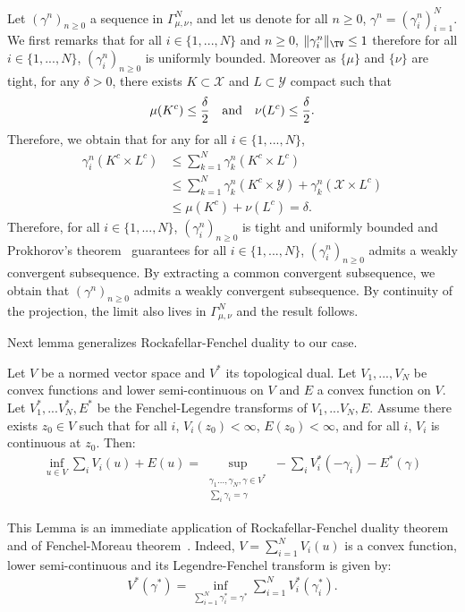 \begin{prv*}
Let $(\gamma^n)_{n\geq 0}$ a sequence in $\Gamma^N_{\mu,\nu}$, and let us denote for all $n\geq 0$, $\gamma^n=(\gamma^n_i)_{i=1}^N$. We first remarks that for all $i\in\{1,...,N\}$ and $n\geq 0$, $\Vert \gamma_i^n\Vert_{\TV}\leq 1$ therefore for all $i\in\{1,...,N\}$, $(\gamma^n_i)_{n\geq 0}$ is uniformly bounded. Moreover as $\{\mu\}$ and $\{\nu\}$ are tight, for any $\delta>0$, there exists $K\subset \mathcal{X} $ and $L\subset \mathcal{Y}$ compact such that 
\begin{align}
    \mu(K^c)\leq \frac{\delta}{2} \text{\quad and\quad }  \nu(L^c)\leq \frac{\delta}{2}.
\end{align}
Therefore, we obtain that for any for all $i\in\{1,...,N\}$,
\begin{align}
    \gamma_i^n(K^c\times L^c)&\leq \sum_{k=1}^N \gamma_k^n(K^c\times L^c)\\
    &\leq  \sum_{k=1}^N \gamma_k^n(K^c\times\mathcal{Y})+\gamma_k^n(\mathcal{X}\times L^c)\\
    &\leq  \mu(K^c) + \nu(L^c) = \delta.
\end{align}
Therefore, for all $i\in\{1,...,N\}$,  $(\gamma_i^n)_{n\geq 0}$ is tight and uniformly bounded and Prokhorov's theorem~\citep[Theorem A.3.15]{dupuis2011weak} guarantees for all $i\in\{1,...,N\}$,  $(\gamma_i^n)_{n\geq 0}$ admits a weakly convergent subsequence. By extracting a common convergent subsequence, we obtain that $(\gamma^n)_{n\geq 0}$ admits a weakly convergent subsequence. By continuity of the projection, the limit also lives in $\Gamma
^N_{\mu,\nu}$ and the result follows.
\end{prv*}

Next lemma generalizes Rockafellar-Fenchel duality to our case.
\begin{lemma}
\label{lem:rockafellar-gene}
Let $V$ be a normed vector space and $V^*$ its topological dual. Let $V_1,...,V_N$ be convex functions and lower semi-continuous on $V$ and $E$ a convex function on $V$. Let $V^*_1,...V^*_N,E^*$ be the Fenchel-Legendre transforms of $V_1,...V_N,E$. Assume there exists $z_0\in V$ such that for all $i$, $V_i(z_0)<\infty$, $E(z_0)<\infty$, and for all $i$, $V_i$ is continuous at $z_0$. Then:
\begin{align*}
\inf_{u\in V} \sum_i V_i(u) + E(u) = \sup\limits_{\substack{\gamma_1...,\gamma_N,\gamma\in V^*\\\sum_i \gamma_i = \gamma}}-\sum_i V^*_i(-\gamma_i)-E^*(\gamma)
\end{align*}
\end{lemma}
\begin{prv*}
This Lemma is an immediate application of Rockafellar-Fenchel duality theorem~\citep[Theorem 1.12]{brezis2010functional} and of Fenchel-Moreau theorem~\citep[Theorem 1.11]{brezis2010functional}. 
Indeed, $V = \sum\limits_{i=1}^N V_i(u)$ is a convex function, lower semi-continuous and its Legendre-Fenchel transform is given by:
\begin{align}
    V^{*}(\gamma^*)=\inf_{\sum\limits_{i=1}^N \gamma_{i}^*=\gamma^*}\sum_{i=1}^N V_i^{*}(\gamma_{i}^*).
\end{align}
\end{prv*}


